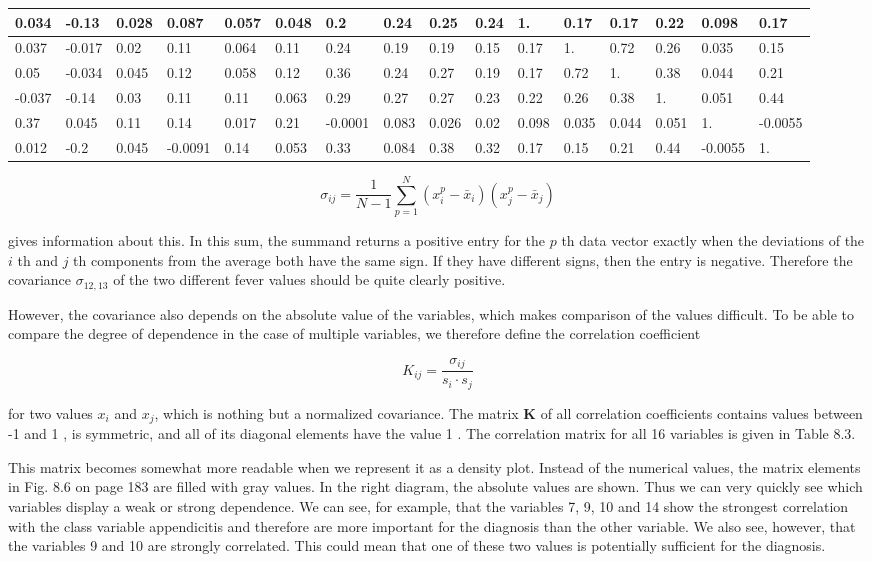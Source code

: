 \documentclass[10pt]{book}
\begin{document}
\begin{table}[htbp]
\begin{center}
\begin{tabular}{|l|l|l|l|l|l|l|l|l|l|l|l|l|l|l|l|}
\hline
0.034 & -0.13 & 0.028 & 0.087 & 0.057 & 0.048 & 0.2 & 0.24 & 0.25 & 0.24 & 1. & 0.17 & 0.17 & 0.22 & 0.098 & 0.17 \\
\hline
0.037 & -0.017 & 0.02 & 0.11 & 0.064 & 0.11 & 0.24 & 0.19 & 0.19 & 0.15 & 0.17 & 1. & 0.72 & 0.26 & 0.035 & 0.15 \\
\hline
0.05 & -0.034 & 0.045 & 0.12 & 0.058 & 0.12 & 0.36 & 0.24 & 0.27 & 0.19 & 0.17 & 0.72 & 1. & 0.38 & 0.044 & 0.21 \\
\hline
-0.037 & -0.14 & 0.03 & 0.11 & 0.11 & 0.063 & 0.29 & 0.27 & 0.27 & 0.23 & 0.22 & 0.26 & 0.38 & 1. & 0.051 & 0.44 \\
\hline
0.37 & 0.045 & 0.11 & 0.14 & 0.017 & 0.21 & -0.0001 & 0.083 & 0.026 & 0.02 & 0.098 & 0.035 & 0.044 & 0.051 & 1. & -0.0055 \\
\hline
0.012 & -0.2 & 0.045 & -0.0091 & 0.14 & 0.053 & 0.33 & 0.084 & 0.38 & 0.32 & 0.17 & 0.15 & 0.21 & 0.44 & -0.0055 & 1. \\
\hline
\end{tabular}
\end{center}
\end{table}

$$
\sigma_{i j}=\frac{1}{N-1} \sum_{p=1}^{N}\left(x_{i}^{p}-\bar{x}_{i}\right)\left(x_{j}^{p}-\bar{x}_{j}\right)
$$

gives information about this. In this sum, the summand returns a positive entry for the $p$ th data vector exactly when the deviations of the $i$ th and $j$ th components from the average both have the same sign. If they have different signs, then the entry is negative. Therefore the covariance $\sigma_{12,13}$ of the two different fever values should be quite clearly positive.

However, the covariance also depends on the absolute value of the variables, which makes comparison of the values difficult. To be able to compare the degree of dependence in the case of multiple variables, we therefore define the correlation coefficient

$$
K_{i j}=\frac{\sigma_{i j}}{s_{i} \cdot s_{j}}
$$

for two values $x_{i}$ and $x_{j}$, which is nothing but a normalized covariance. The matrix $\boldsymbol{K}$ of all correlation coefficients contains values between -1 and 1 , is symmetric, and all of its diagonal elements have the value 1 . The correlation matrix for all 16 variables is given in Table 8.3.

This matrix becomes somewhat more readable when we represent it as a density plot. Instead of the numerical values, the matrix elements in Fig. 8.6 on page 183 are filled with gray values. In the right diagram, the absolute values are shown. Thus we can very quickly see which variables display a weak or strong dependence. We can see, for example, that the variables 7, 9, 10 and 14 show the strongest correlation with the class variable appendicitis and therefore are more important for the diagnosis than the other variable. We also see, however, that the variables 9 and 10 are strongly correlated. This could mean that one of these two values is potentially sufficient for the diagnosis.
\end{document}
